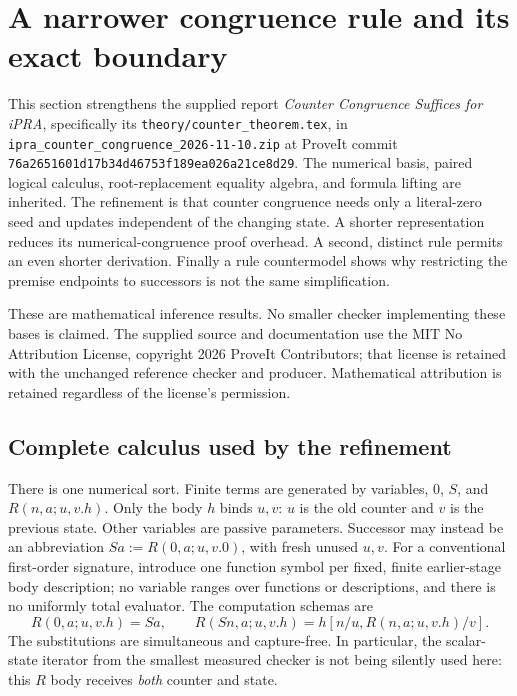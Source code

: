 \section{A narrower congruence rule and its exact boundary}
\label{zcc:section}

This section strengthens the supplied report \emph{Counter Congruence
Suffices for iPRA}, specifically its \texttt{theory/counter\_theorem.tex},
in \texttt{ipra\_counter\_congruence\_2026-11-10.zip} at ProveIt commit
\texttt{76a2651601d17b34d46753f189ea026a21ce8d29}. The numerical basis,
paired logical calculus, root-replacement equality algebra, and formula
lifting are inherited. The refinement is that counter congruence needs
only a literal-zero seed and updates independent of the changing state.
A shorter representation reduces its numerical-congruence proof overhead.
A second, distinct rule permits an even shorter derivation. Finally a
rule countermodel shows why restricting the premise endpoints to
successors is not the same simplification.

These are mathematical inference results. No smaller checker implementing
these bases is claimed. The supplied source and documentation use the
MIT No Attribution License, copyright 2026 ProveIt Contributors; that
license is retained with the unchanged reference checker and producer.
Mathematical attribution is retained regardless of the license's permission.

\subsection{Complete calculus used by the refinement}

There is one numerical sort. Finite terms are generated by variables,
$0$, $S$, and $R(n,a;u,v.h)$. Only the body $h$ binds $u,v$: $u$ is the
old counter and $v$ is the previous state. Other variables are passive
parameters. Successor may instead be an abbreviation
$Sa:=R(0,a;u,v.0)$, with fresh unused $u,v$. For a conventional first-order
signature, introduce one function symbol per fixed, finite earlier-stage
body description; no variable ranges over functions or descriptions, and
there is no uniformly total evaluator. The computation schemas are
\[
 R(0,a;u,v.h)=Sa,\qquad
 R(Sn,a;u,v.h)=h[n/u,R(n,a;u,v.h)/v].
 \tag{R0, RS}\label{zcc:computation}
\]
The substitutions are simultaneous and capture-free. In particular,
the scalar-state iterator from the smallest measured checker is not being
silently used here: this $R$ body receives \emph{both} counter and state.


